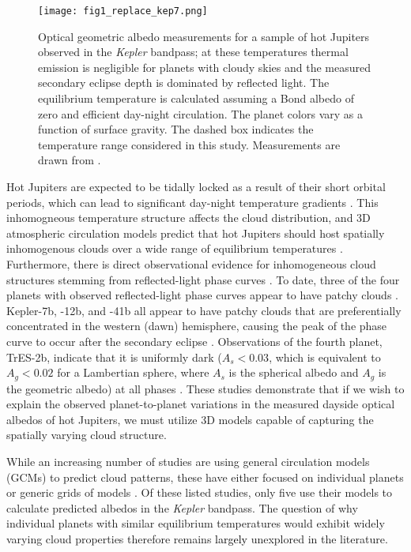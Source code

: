 \documentclass[twocolumn]{aastex63}
\begin{document}
\begin{figure}
    \texttt{[image: fig1\_replace\_kep7.png]}
    \caption{Optical geometric albedo measurements for a sample of hot Jupiters observed in the \emph{Kepler} bandpass; at these temperatures thermal emission is negligible for planets with cloudy skies and the measured secondary eclipse depth is dominated by reflected light. The equilibrium temperature is calculated assuming a Bond albedo of zero and efficient day-night circulation. The planet colors vary as a function of surface gravity. The dashed box indicates the temperature range considered in this study. Measurements are drawn from \citet[][]{fortney2011, desert2011, barclay2012, esteves2013, shporer2015, niraula2018, heng2020}.
    }
    \label{fig:kepalbedos}
\end{figure}

Hot Jupiters are expected to be tidally locked as a result of their short orbital periods, which can lead to significant day-night temperature gradients \citep[e.g.][]{guillot2002}.  This inhomogneous temperature structure affects the cloud distribution, and 3D atmospheric circulation models predict that hot Jupiters should host spatially inhomogenous clouds over a wide range of equilibrium temperatures \citep[e.g.][]{parmentier2016, parmentier2021, roman2021}. Furthermore, there is direct observational evidence for inhomogeneous cloud structures stemming from reflected-light phase curves \citep[e.g.,][]{demory2013}.  To date, three of the four planets with observed reflected-light phase curves appear to have patchy clouds \citep[][also see Figure \ref{fig:kepalbedos}]{desert2011,demory2013, angerhausen2014,esteves2015,shporer2015,vonparis2016,niraula2018}. Kepler-7b, -12b, and -41b all appear to have patchy clouds that are preferentially concentrated in the western (dawn) hemisphere, causing the peak of the phase curve to occur after the secondary eclipse \citep{shporer2015}. Observations of the fourth planet, TrES-2b, indicate that it is uniformly dark ($A_s<0.03$, which is equivalent to $A_g<0.02$ for a Lambertian sphere, where $A_s$ is the spherical albedo and $A_g$ is the geometric albedo) at all phases \citep{vonparis2016}. These studies demonstrate that if we wish to explain the observed planet-to-planet variations in the measured dayside optical albedos of hot Jupiters, we must utilize 3D models capable of capturing the spatially varying cloud structure. 

While an increasing number of studies are using general circulation models (GCMs) to predict cloud patterns, these have either focused on individual planets \citep[e.g.][]{webber2015,lee2015,oreshenko2016,helling2019a,helling2019b,helling2020,lines2018,lines2019,roman2019} or generic grids of models \citep[e.g.][]{parmentier2016,parmentier2021,roman2021}. Of these listed studies, only five \citep{webber2015,oreshenko2016,parmentier2016,parmentier2021,roman2021} use their models to calculate predicted albedos in the \emph{Kepler} bandpass. The question of why individual planets with similar equilibrium temperatures would exhibit widely varying cloud properties therefore remains \textcolor{black}{largely} unexplored in the literature.
\end{document}
